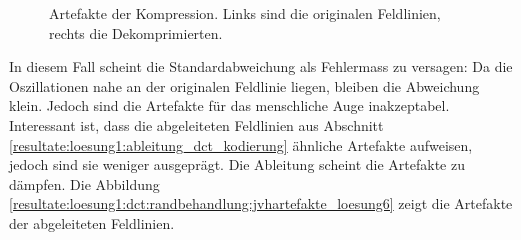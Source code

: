 \begin{figure}[!htbp]
	\center
	\caption{Artefakte der Kompression. Links sind die originalen Feldlinien, rechts die Dekomprimierten.}
	\label{resultate:loesung1:dct:randbehandlung:jvhartefakte}
\end{figure} 
In diesem Fall scheint die Standardabweichung als Fehlermass zu versagen: Da die Oszillationen nahe an der originalen Feldlinie liegen, bleiben die Abweichung klein. Jedoch sind die Artefakte für das menschliche Auge inakzeptabel.\\
Interessant ist, dass die abgeleiteten Feldlinien aus Abschnitt \ref{resultate:loesung1:ableitung_dct_kodierung} ähnliche Artefakte aufweisen, jedoch sind sie weniger ausgeprägt. Die Ableitung scheint die Artefakte zu dämpfen. Die Abbildung \ref{resultate:loesung1:dct:randbehandlung:jvhartefakte_loesung6} zeigt die Artefakte der abgeleiteten Feldlinien.

